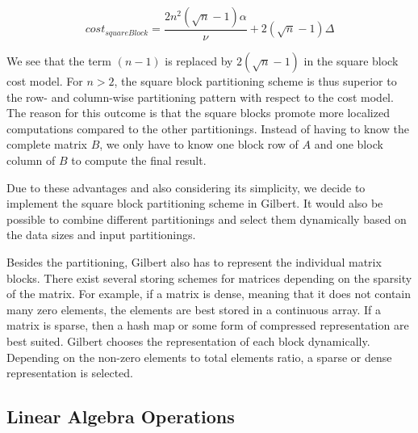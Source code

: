 \begin{displaymath}
	cost_{squareBlock} = \frac{2n^2\left(\sqrt{n}-1\right)\alpha}{\nu} + 2\left(\sqrt{n}-1\right)\Delta
\end{displaymath}

We see that the term $(n-1)$ is replaced by $2\left(\sqrt{n}-1\right)$ in the square block cost model.
For $n>2$, the square block partitioning scheme is thus superior to the row- and column-wise partitioning pattern with respect to the cost model.
The reason for this outcome is that the square blocks promote more localized computations compared to the other partitionings.
Instead of having to know the complete matrix $B$, we only have to know one block row of $A$ and one block column of $B$ to compute the final result.

Due to these advantages and also considering its simplicity, we decide to implement the square block partitioning scheme in Gilbert.
It would also be possible to combine different partitionings and select them dynamically based on the data sizes and input partitionings.

Besides the partitioning, Gilbert also has to represent the individual matrix blocks.
There exist several storing schemes for matrices depending on the sparsity of the matrix.
For example, if a matrix is dense, meaning that it does not contain many zero elements, the elements are best stored in a continuous array.
If a matrix is sparse, then a hash map or some form of compressed representation are best suited.
Gilbert chooses the representation of each block dynamically.
Depending on the non-zero elements to total elements ratio, a sparse or dense representation is selected.

\subsection{Linear Algebra Operations}
\label{sec:LinearAlgebraOperations}

